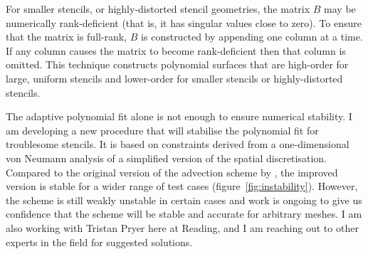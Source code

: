 \documentclass[a4paper,11pt]{article}
\begin{document}
For smaller stencils, or highly-distorted stencil geometries, the matrix $B$ may be numerically rank-deficient (that is, it has singular values close to zero).  To ensure that the matrix is full-rank, $B$ is constructed by appending one column at a time.  If any column causes the matrix to become rank-deficient then that column is omitted.  This technique constructs polynomial surfaces that are high-order for large, uniform stencils and lower-order for smaller stencils or highly-distorted stencils.

The adaptive polynomial fit alone is not enough to ensure numerical stability.  I am developing a new procedure that will stabilise the polynomial fit for troublesome stencils.  It is based on constraints derived from a one-dimensional von Neumann analysis of a simplified version of the spatial discretisation.  Compared to the original version of the advection scheme by \citet{weller-shahrokhi2014}, the improved version is stable for a wider range of test cases (figure~\ref{fig:instability}).  
However, the scheme is still weakly unstable in certain cases and work is ongoing to give us confidence that the scheme will be stable and accurate for arbitrary meshes.
I am also working with Tristan Pryer here at Reading, and I am reaching out to other experts in the field for suggested solutions.
\end{document}
